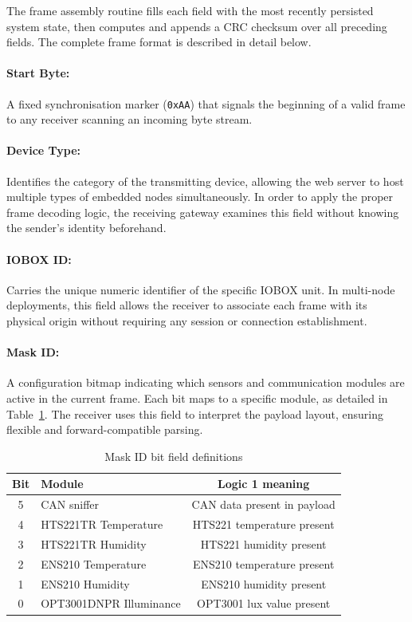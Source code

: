 The frame assembly routine fills each field with the most recently persisted system state, then computes and appends a CRC checksum over all preceding fields. The complete frame format is described in detail below.

\paragraph{Start Byte:}
A fixed synchronisation marker (\texttt{0xAA}) that signals the beginning of a valid frame to any receiver scanning an incoming byte stream.

\paragraph{Device Type:}
Identifies the category of the transmitting device, allowing the web server to host multiple types of embedded nodes simultaneously. In order to apply the proper frame decoding logic, the receiving gateway examines this field without knowing the sender's identity beforehand.

\paragraph{IOBOX ID:}
Carries the unique numeric identifier of the specific IOBOX unit. In multi-node deployments, this field allows the receiver to associate each frame with its physical origin without requiring any session or connection establishment.

\paragraph{Mask ID:}
A configuration bitmap indicating which sensors and communication modules are active in the current frame. Each bit maps to a specific module, as detailed in Table~\ref{tab:mask_id}. The receiver uses this field to interpret the payload layout, ensuring flexible and forward-compatible parsing.

\begin{table}[H]
    \centering
    \caption{Mask ID bit field definitions}
    \label{tab:mask_id}
    \begin{tabular}{|c|l|c|}
        \hline
        \textbf{Bit} & \textbf{Module} & \textbf{Logic 1 meaning} \\
        \hline
        5 & CAN sniffer             & CAN data present in payload \\
        \hline
        4 & HTS221TR Temperature    & HTS221 temperature present \\
        \hline
        3 & HTS221TR Humidity       & HTS221 humidity present \\
        \hline
        2 & ENS210 Temperature      & ENS210 temperature present \\
        \hline
        1 & ENS210 Humidity         & ENS210 humidity present \\
        \hline
        0 & OPT3001DNPR Illuminance & OPT3001 lux value present \\
        \hline
    \end{tabular}
\end{table}

